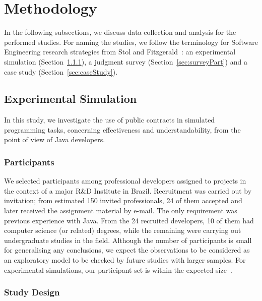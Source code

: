 \section{Methodology}
\label{sec:researchDesign}

In the following subsections, we discuss data collection and analysis for the performed studies. For naming the studies, we follow the terminology for Software Engineering research strategies from Stol and Fitzgerald~\cite{Stol2015}: an experimental simulation (Section~\ref{sec:expPart}), a judgment survey (Section~\ref{sec:surveyPart}) and a case study (Section~\ref{sec:caseStudy}).

\subsection{Experimental Simulation}
\label{sec:experiment}

In this study, we investigate the use of
public contracts in simulated programming tasks, concerning effectiveness and understandability, from the point of view of Java developers.

\subsubsection{Participants}
\label{sec:expPart}

We selected participants among professional developers assigned to projects in the context of a major R\&D Institute in Brazil. Recruitment was carried out by invitation; from estimated 150 invited professionals, 24 of them accepted and later received the assignment material by e-mail. The only requirement was previous experience with Java. From the 24 recruited developers, 10 of them had computer science (or related) degrees, while the remaining were carrying out undergraduate studies in the field. 
Although the number of participants is small for generalising any conclusions, we expect the observations to be considered as an exploratory model to be checked by future studies with larger samples. For experimental simulations, our participant set is within the expected size~\cite{Stol2015}.


\subsubsection{Study Design}
\label{sec:studyDesign}

